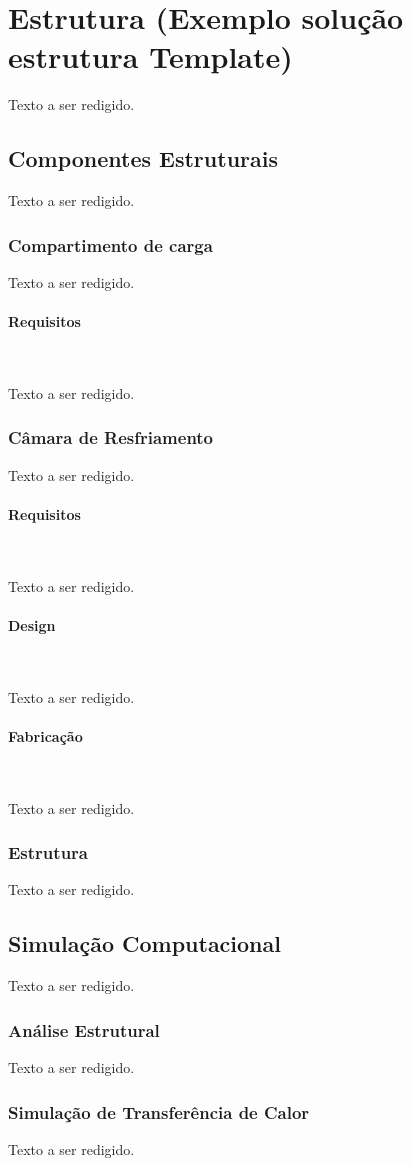 \section{Estrutura (Exemplo solução estrutura Template)}

Texto a ser redigido.

\subsection{Componentes Estruturais}

Texto a ser redigido.

\subsubsection{Compartimento de carga}

Texto a ser redigido.

\paragraph*{Requisitos}\

Texto a ser redigido.

\subsubsection{Câmara de Resfriamento}

Texto a ser redigido.

\paragraph*{Requisitos}\

Texto a ser redigido.

\paragraph*{Design}\

Texto a ser redigido.

\paragraph*{Fabricação}\

Texto a ser redigido.

\subsubsection{Estrutura}

Texto a ser redigido.

\subsection{Simulação Computacional}

Texto a ser redigido.

\subsubsection{Análise Estrutural}

Texto a ser redigido.

\subsubsection{Simulação de Transferência de Calor }

Texto a ser redigido.